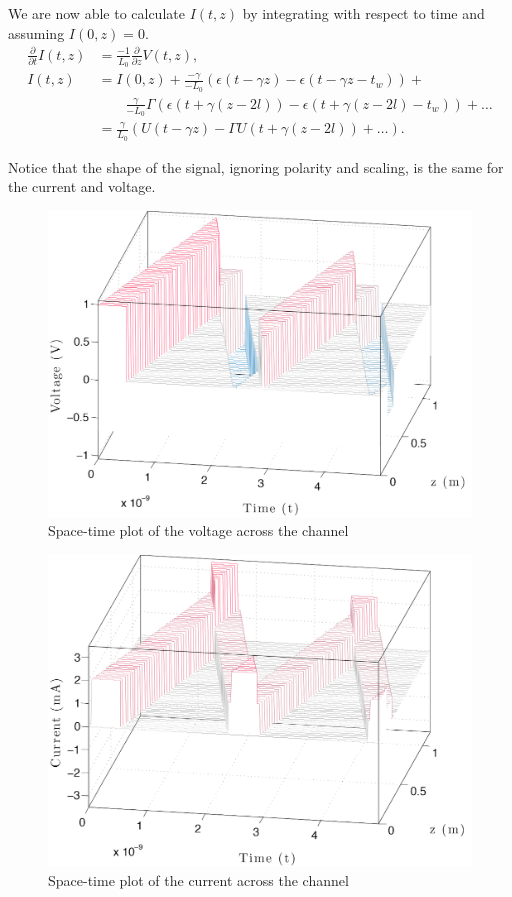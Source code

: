 \documentclass[11pt,titlepage]{report}
\begin{document}
We are now able to calculate $I(t,z)$ by integrating with respect to time and assuming $I(0,z)=0$.
\begin{align}
	\frac{\partial}{\partial t} I(t, z) &= \frac{-1}{L_0} \frac{\partial}{\partial z}V(t,z), \\
	I(t, z) &= I(0, z) + \frac{-\gamma}{-L_0} \left(\epsilon(t- \gamma z) - \epsilon(t - \gamma z - t_w) \right) + \nonumber \\
	&\quad \quad \frac{\gamma}{-L_0} \Gamma \left( \epsilon(t + \gamma(z-2l)) - \epsilon(t+ \gamma (z-2l)-t_w)\right) + \dots \\
	&= \frac{\gamma}{L_0} \left( U(t- \gamma z) - \Gamma U(t+ \gamma( z - 2l)) + \dots \right).
\end{align}

Notice that the shape of the signal, ignoring polarity and scaling, is the same for the current and voltage.

\begin{figure}[H]
	\centering
	\includegraphics[width=.85\linewidth]{resource/voltage-cropped.pdf}
	\caption{Space-time plot of the voltage across the channel}
	\label{fig:ass-1-v}
\end{figure}
\begin{figure}[H]
	\centering
	\includegraphics[width=.85\linewidth]{resource/current-cropped.pdf}
	\caption{Space-time plot of the current across the channel}
	\label{fig:ass-1-i}
\end{figure}
\end{document}
